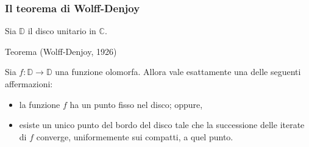 \begin{frame}
  \frametitle{Il teorema di Wolff-Denjoy}
  Sia $\mathbb{D}$ il disco unitario in $\mathbb{C}$.\pause
  \begin{block}{Teorema (Wolff-Denjoy, 1926)}
    \begin{itshape}
      Sia $f:\mathbb{D} \longrightarrow \mathbb{D}$ una funzione olomorfa. \pause Allora vale esattamente una delle seguenti affermazioni:\pause
      \begin{itemize}
        \item la funzione $f$ ha un punto fisso nel disco; \pause oppure,
        \item esiste un unico punto del bordo del disco tale che la successione delle iterate di $f$ converge, uniformemente sui compatti, a quel punto.
      \end{itemize}
    \end{itshape}
  \end{block}
\end{frame}

